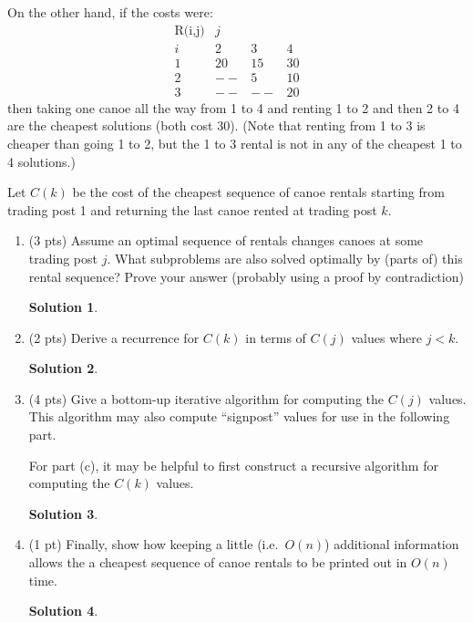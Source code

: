 \documentclass[11pt]{article}
\newtheorem*{solution}{Solution}
\begin{document}
\begin{enumerate}
On the other hand, if the costs were:
\[
\begin{array}{lccc} 
\mbox{R(i,j)} & {j}  \\
{i} &   2 &   3 &   4 \\ \hline
1   &  20 &  15 &  30 \\
2   &  -- &  5 &  10 \\
3   &  -- & -- & 20
\end{array}
\]
then taking one canoe all the way from 1 to 4 and 
renting 1 to 2 and then 2 to 4 are the cheapest solutions (both cost 30). 
(Note that renting from 1 to 3 is cheaper than going 1 to 2, but the 
1 to 3 rental is not in any of the cheapest 1 to 4 solutions.)

Let $C(k)$ be the cost of the cheapest sequence of canoe rentals starting
from trading post 1 and returning the last canoe rented at trading post $k$.
\newpage
\begin{enumerate}
\item (3 pts)  Assume an optimal sequence of rentals changes canoes at
some trading post $j$.  What subproblems are also solved optimally
by (parts of) this rental sequence?  Prove your answer (probably using a proof by contradiction)
\begin{solution}

\end{solution}
\newpage

\item (2 pts) Derive a recurrence for $C(k)$
in terms of $C(j)$ values where $j<k$.
\begin{solution}

\end{solution}
\newpage

\item (4 pts) 
Give a bottom-up iterative algorithm for computing the
$C(j)$ values.  
This algorithm may also compute ``signpost'' values for use in the following part.

For part (c), it may be helpful to first construct a recursive algorithm for
computing the $C(k)$ values.
\begin{solution}

\end{solution}
\newpage

\item(1 pt) 
Finally, show how keeping a little (i.e.~$O(n)$) additional information allows the
a cheapest sequence of canoe rentals to be printed out in $O(n)$ time.
\begin{solution}


\end{solution}
\end{enumerate}
\end{enumerate}
\end{document}
